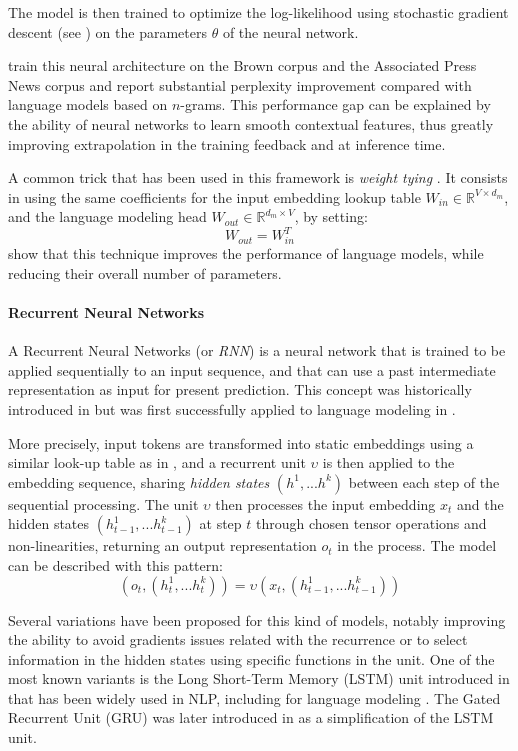 The model is then trained to optimize the log-likelihood using stochastic gradient descent (see ) on the parameters $\theta$ of the neural network.

\citet{bengio2000neural} train this neural architecture on the Brown corpus and the Associated Press News corpus and report substantial perplexity improvement compared with language models based on $n$-grams. This performance gap can be explained by the ability of neural networks to learn smooth contextual features, thus greatly improving extrapolation in the training feedback and at inference time.

A common trick that has been used in this framework is \textit{weight tying} \citep{press-wolf-2017-using}. It consists in using the same coefficients for the input embedding lookup table $W_{in} \in \mathbb{R}^{V \times d_m}$, and the language modeling head $W_{out} \in \mathbb{R}^{d_m \times V}$, by setting:
$$
W_{out} = W_{in}^T
$$
\citet{press-wolf-2017-using} show that this technique improves the performance of language models, while reducing their overall number of parameters.

\paragraph*{Recurrent Neural Networks}

A Recurrent Neural Networks (or \textit{RNN}) is a neural network that is trained to be applied sequentially to an input sequence, and that can use a past intermediate representation as input for present prediction. This concept was historically introduced in \citet{rnn_origins} but was first successfully applied to language modeling in \citet{mikolov10_interspeech}.

More precisely, input tokens are transformed into static embeddings using a similar look-up table as in \citet{bengio2000neural}, and a recurrent unit $\upsilon$ is then applied to the embedding sequence, sharing \textit{hidden states} $(h^1,...h^k)$ between each step of the sequential processing. The unit $\upsilon$ then processes the input embedding $x_t$ and the hidden states $(h_{t-1}^1,...h_{t-1}^k)$ at step $t$ through chosen tensor operations and non-linearities, returning an output representation $o_t$ in the process. The model can be described with this pattern:
$$
(o_{t}, (h_{t}^1,...h_{t}^k)) = \upsilon(x_t, (h_{t-1}^1,...h_{t-1}^k))
$$

Several variations have been proposed for this kind of models, notably improving the ability to avoid gradients issues related with the recurrence or to select information in the hidden states using specific functions in the unit. One of the most known variants is the Long Short-Term Memory (LSTM) unit introduced in \citet{HochSchm97} that has been widely used in NLP, including for language modeling \citep{miyamoto-cho-2016-gated}. The Gated Recurrent Unit (GRU) was later introduced in \citet{cho2014learningphraserepresentationsusing} as a simplification of the LSTM unit.

